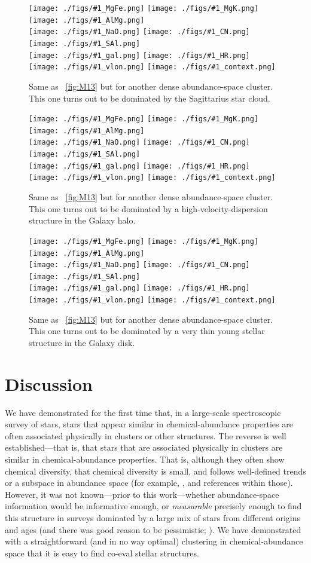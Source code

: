 \documentclass[12pt, letterpaper, preprint]{aastex}
\newcommand{\insanefigure}[1]{%
\texttt{[image: ./figs/\#1\_MgFe.png]}%
\texttt{[image: ./figs/\#1\_MgK.png]}%
\texttt{[image: ./figs/\#1\_AlMg.png]}\\
\texttt{[image: ./figs/\#1\_NaO.png]}%
\texttt{[image: ./figs/\#1\_CN.png]}%
\texttt{[image: ./figs/\#1\_SAl.png]}\\
\texttt{[image: ./figs/\#1\_gal.png]}%
\texttt{[image: ./figs/\#1\_HR.png]}\\
\texttt{[image: ./figs/\#1\_vlon.png]}%
\texttt{[image: ./figs/\#1\_context.png]}}
\begin{document}
\begin{figure}[!p]
\insanefigure{cluster_0256_0177}
\caption{Same as \figurename~\ref{fig:M13} but for another dense
  abundance-space cluster.
  This one turns out to be dominated by the Sagittarius star
  cloud.\label{fig:Sgr}}
\end{figure}
\begin{figure}[!p]
\insanefigure{cluster_0256_0010}
\caption{Same as \figurename~\ref{fig:M13} but for another dense
  abundance-space cluster.
  This one turns out to be dominated by a high-velocity-dispersion
  structure in the Galaxy halo.\label{fig:halo}}
\end{figure}
\begin{figure}[!p]
\insanefigure{cluster_0256_0141}
\caption{Same as \figurename~\ref{fig:M13} but for another dense
  abundance-space cluster.
  This one turns out to be dominated by a very thin young stellar
  structure in the Galaxy disk.\label{fig:disk}}
\end{figure}

\clearpage
\section{Discussion}\label{sec:discussion}

We have demonstrated for the first time that, in a large-scale
spectroscopic survey of stars, stars that appear similar in
chemical-abundance properties are often associated physically in
clusters or other structures.
The reverse is well established---that is, that stars that are
associated physically in clusters are similar in chemical-abundance
properties.
That is, although they often show chemical diversity, that chemical
diversity is small, and follows well-defined trends or a subspace in
abundance space (for example, \citealt{gratton, meszaros, bovy},
and references within those).
However, it was not known---prior to this work---whether abundance-space information would be
informative enough, or \emph{measurable} precisely enough to find this
structure in surveys dominated by a large mix of stars from different
origins and ages (and there was good reason to be pessimistic;
\citealt{ting}).
We have demonstrated with a straightforward (and in no way optimal)
clustering in chemical-abundance space that it is easy to find co-eval
stellar structures.
\end{document}
